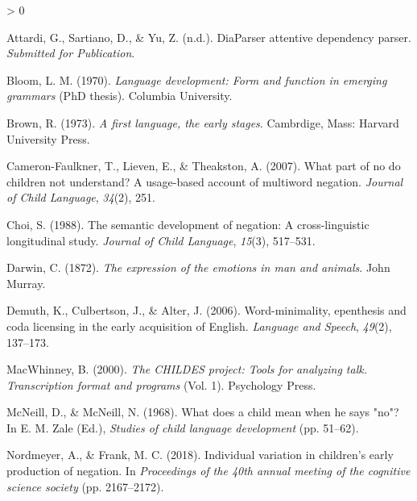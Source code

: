 \documentclass[
  english,
  man,floatsintext]{apa6}
\newlength{\cslhangindent}
\newenvironment{CSLReferences}[2] %
 {%
  \setlength{\parindent}{0pt}
  \ifodd #1 \everypar{\setlength{\hangindent}{\cslhangindent}}\ignorespaces\fi
  \ifnum #2 > 0
  \setlength{\parskip}{#2\baselineskip}
  \fi
 }%
 {}
\begin{document}
\begingroup
\setlength{\parindent}{-0.5in}
\setlength{\leftskip}{0.5in}

\endgroup

\hypertarget{refs}{}
\begin{CSLReferences}{1}{0}
\leavevmode\hypertarget{ref-diaparser}{}%
Attardi, G., Sartiano, D., \& Yu, Z. (n.d.). DiaParser attentive dependency parser. \emph{Submitted for Publication}.

\leavevmode\hypertarget{ref-bloom1970language}{}%
Bloom, L. M. (1970). \emph{Language development: Form and function in emerging grammars} (PhD thesis). Columbia University.

\leavevmode\hypertarget{ref-Brown1973}{}%
Brown, R. (1973). \emph{A first language, the early stages}. Cambrdige, Mass: Harvard University Press.

\leavevmode\hypertarget{ref-cameron2007part}{}%
Cameron-Faulkner, T., Lieven, E., \& Theakston, A. (2007). What part of no do children not understand? A usage-based account of multiword negation. \emph{Journal of Child Language}, \emph{34}(2), 251.

\leavevmode\hypertarget{ref-choi1988semantic}{}%
Choi, S. (1988). The semantic development of negation: A cross-linguistic longitudinal study. \emph{Journal of Child Language}, \emph{15}(3), 517--531.

\leavevmode\hypertarget{ref-darwin1872expression}{}%
Darwin, C. (1872). \emph{The expression of the emotions in man and animals}. John Murray.

\leavevmode\hypertarget{ref-demuth2006word}{}%
Demuth, K., Culbertson, J., \& Alter, J. (2006). Word-minimality, epenthesis and coda licensing in the early acquisition of {E}nglish. \emph{Language and Speech}, \emph{49}(2), 137--173.

\leavevmode\hypertarget{ref-macwhinney2000childes}{}%
MacWhinney, B. (2000). \emph{The CHILDES project: Tools for analyzing talk. Transcription format and programs} (Vol. 1). Psychology Press.

\leavevmode\hypertarget{ref-mcneill1968}{}%
McNeill, D., \& McNeill, N. (1968). What does a child mean when he says "no"? In E. M. Zale (Ed.), \emph{Studies of child language development} (pp. 51--62).

\leavevmode\hypertarget{ref-nordmeyer2018individual}{}%
Nordmeyer, A., \& Frank, M. C. (2018). Individual variation in children's early production of negation. In \emph{Proceedings of the 40th annual meeting of the cognitive science society} (pp. 2167--2172).


\end{CSLReferences}
\end{document}
